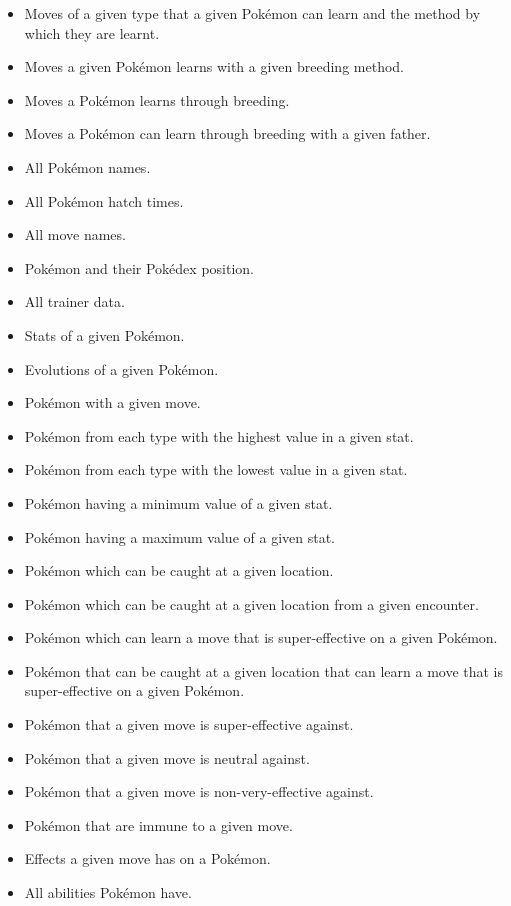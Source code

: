 \documentclass{article}
\begin{document}
\begin{itemize}
    \item Moves of a given type that a given Pok\'emon can learn and the method by which they are
        learnt.
    \item Moves a given Pok\'emon learns with a given breeding method.
    \item Moves a Pok\'emon learns through breeding.
    \item Moves a Pok\'emon can learn through breeding with a given father.
    \item All Pok\'emon names.
    \item All Pok\'emon hatch times.
    \item All move names.
    \item Pok\'emon and their Pok\'edex position.
    \item All trainer data.
    \item Stats of a given Pok\'emon.
    \item Evolutions of a given Pok\'emon.
    \item Pok\'emon with a given move.
    \item Pok\'emon from each type with the highest value in a given stat.
    \item Pok\'emon from each type with the lowest value in a given stat.
    \item Pok\'emon having a minimum value of a given stat.
    \item Pok\'emon having a maximum value of a given stat.
    \item Pok\'emon which can be caught at a given location.
    \item Pok\'emon which can be caught at a given location from a given encounter.
    \item Pok\'emon which can learn a move that is super-effective on a given Pok\'emon.
    \item Pok\'emon that can be caught at a given location that can learn a move that is 
        super-effective on a given Pok\'emon.
    \item Pok\'emon that a given move is super-effective against.
    \item Pok\'emon that a given move is neutral against.
    \item Pok\'emon that a given move is non-very-effective against.
    \item Pok\'emon that are immune to a given move.
    \item Effects a given move has on a Pok\'emon.
    \item All abilities Pok\'emon have.

\end{itemize}
\end{document}
